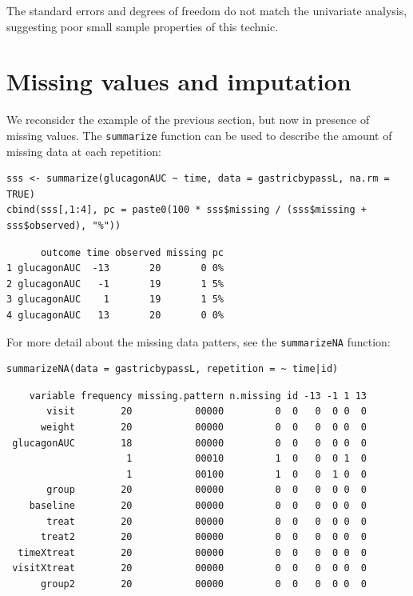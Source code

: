 \documentclass[12pt]{article}
\begin{document}
The standard errors and degrees of freedom do not match the univariate
analysis, suggesting poor small sample properties of this
technic.

\clearpage

\section{Missing values and imputation}
\label{sec:org3748bdb}

We reconsider the example of the previous section, but now in presence
of missing values. The \texttt{summarize} function can be used to describe
the amount of missing data at each repetition:
\lstset{language=r,label= ,caption= ,captionpos=b,numbers=none}
\begin{lstlisting}
sss <- summarize(glucagonAUC ~ time, data = gastricbypassL, na.rm = TRUE)
cbind(sss[,1:4], pc = paste0(100 * sss$missing / (sss$missing + sss$observed), "%"))
\end{lstlisting}

\begin{verbatim}
      outcome time observed missing pc
1 glucagonAUC  -13       20       0 0%
2 glucagonAUC   -1       19       1 5%
3 glucagonAUC    1       19       1 5%
4 glucagonAUC   13       20       0 0%
\end{verbatim}


For more detail about the missing data patters, see the \texttt{summarizeNA}
function:
\lstset{language=r,label= ,caption= ,captionpos=b,numbers=none}
\begin{lstlisting}
summarizeNA(data = gastricbypassL, repetition = ~ time|id)
\end{lstlisting}

\begin{verbatim}
    variable frequency missing.pattern n.missing id -13 -1 1 13
       visit        20           00000         0  0   0  0 0  0
      weight        20           00000         0  0   0  0 0  0
 glucagonAUC        18           00000         0  0   0  0 0  0
                     1           00010         1  0   0  0 1  0
                     1           00100         1  0   0  1 0  0
       group        20           00000         0  0   0  0 0  0
    baseline        20           00000         0  0   0  0 0  0
       treat        20           00000         0  0   0  0 0  0
      treat2        20           00000         0  0   0  0 0  0
  timeXtreat        20           00000         0  0   0  0 0  0
 visitXtreat        20           00000         0  0   0  0 0  0
      group2        20           00000         0  0   0  0 0  0
\end{verbatim}
\end{document}
